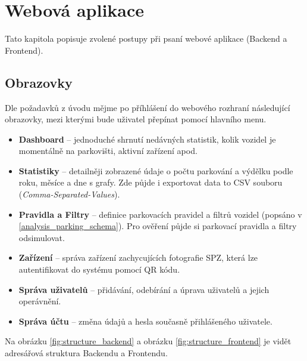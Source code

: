 
\chapter{Webová aplikace}

Tato kapitola popisuje zvolené postupy při psaní webové aplikace (Backend a Frontend).

\section{Obrazovky}

Dle požadavků z úvodu mějme po příhlášení do webového rozhraní následující obrazovky, mezi kterými bude uživatel přepínat pomocí hlavního menu.

\begin{itemize}
  \item \textbf{Dashboard} -- jednoduché shrnutí nedávných statistik, kolik vozidel je
        momentálně na parkovišti, aktivní zařízení apod.
  \item \textbf{Statistiky} -- detailněji zobrazené údaje o počtu parkování a výdělku podle roku, měsíce a dne s grafy.
        Zde půjde i exportovat data to CSV souboru (\textit{Comma-Separated-Values}).
  \item \textbf{Pravidla a Filtry} -- definice parkovacích pravidel a filtrů vozidel (popsáno v \ref{analysis_parking_schema}).
        Pro ověření půjde si parkovací pravidla a filtry odsimulovat.
  \item \textbf{Zařízení} -- správa zařízení zachycujících fotografie SPZ, která lze autentifikovat do systému pomocí
        QR kódu.
  \item \textbf{Správa uživatelů} -- přidávání, odebírání a úprava uživatelů a jejich operávnění.
  \item \textbf{Správa účtu} -- změna údajů a hesla současně přihlášeného uživatele.
\end{itemize}

Na obrázku \ref{fig:structure_backend} a obrázku \ref{fig:structure_frontend} je
vidět adresářová struktura Backendu a Frontendu.

